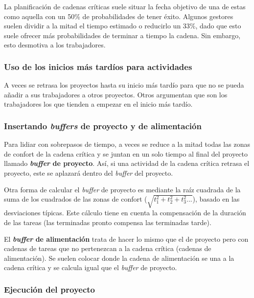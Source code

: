 \documentclass[12pt]{article}
\begin{document}
{La planificación de cadenas críticas suele situar la fecha objetivo de una de estas como aquella con un 50\% de probabilidades de tener éxito. Algunos gestores suelen dividir a la mitad el tiempo estimado o reducirlo un 33\%, dado que esto suele ofrecer más probabilidades de terminar a tiempo la cadena. Sin embargo, esto desmotiva a los trabajadores.}

\subsubsection{Uso de los inicios más tardíos para actividades}
\label{7.12.2}

{A veces se retrasa los proyectos hasta su inicio más tardío para que no se pueda añadir a sus trabajadores a otros proyectos. Otros argumentan que son los trabajadores los que tienden a empezar en el inicio más tardío.}

\subsubsection{Insertando \textit{buffers} de proyecto y de alimentación}
\label{7.12.3}

{Para lidiar con sobrepasos de tiempo, a veces se reduce a la mitad todas las zonas de confort de la cadena crítica y se juntan en un solo tiempo al final del proyecto llamado \textbf{\textit{buffer} de proyecto}. Así, si una actividad de la cadena crítica retrasa el proyecto, este se aplazará dentro del \textit{buffer} del proyecto.} \bigskip

{Otra forma de calcular el \textit{buffer} de proyecto es mediante la raíz cuadrada de la suma de los cuadrados de las zonas de confort ($\sqrt{t_1^2 + t_2^2 + t_3^2...}$), basado en las desviaciones típicas. Este cálculo tiene en cuenta la compensación de la duración de las tareas (las terminadas pronto compensa las terminadas tarde).} \bigskip

{El \textbf{\textit{buffer} de alimentación} trata de hacer lo mismo que el de proyecto pero con cadenas de tareas que no pertenezcan a la cadena crítica (cadenas de alimentación). Se suelen colocar donde la cadena de alimentación se una a la cadena crítica y se calcula igual que el \textit{buffer} de proyecto.}

\newpage
\subsubsection{Ejecución del proyecto}
\label{7.12.4}
\end{document}
